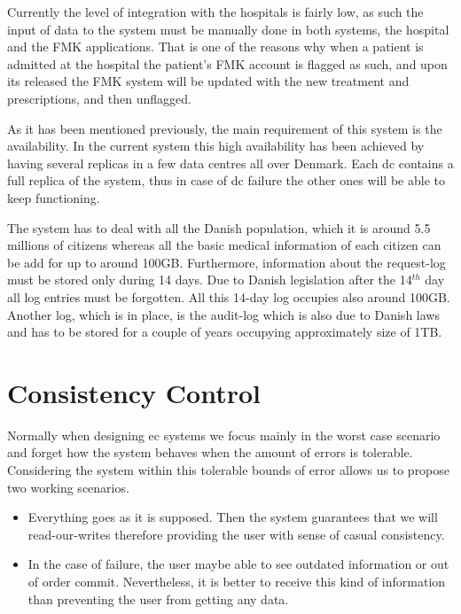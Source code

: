 \documentclass[english]{article}
\begin{document}
Currently the level of integration with the hospitals is fairly low, as such the input of data to the system must be manually done in both systems, the hospital and the FMK applications. That is one of the reasons why when a patient is admitted at the hospital the patient's FMK account is flagged as such, and upon its released the FMK system will be updated with the new treatment and prescriptions, and then unflagged.

As it has been mentioned previously, the main requirement of this system is the availability. In the current system this high availability has been achieved by having several replicas in a few data centres all over Denmark. Each \gls{dc} contains a full replica of the system, thus in case of \gls{dc} failure the other ones will be able to keep functioning.

The system has to deal with all the Danish population, which it is around 5.5 millions of citizens whereas all the basic medical information of each citizen can be add for up to around 100GB. Furthermore, information about the request-log must be stored only during 14 days. Due to Danish legislation after the 14$^{th}$ day all log entries must be forgotten. All this 14-day log occupies also around 100GB. Another log, which is in place, is the audit-log which is also due to Danish laws and has to be stored for a couple of years occupying approximately size of 1TB. 



\section{Consistency Control}

Normally when designing \gls{ec} systems we focus mainly in the worst case scenario and forget how the system behaves when the amount of errors is tolerable. Considering the system within this tolerable bounds of error allows us to propose two working scenarios.
\begin{itemize}
	\item Everything goes as it is supposed. Then the system guarantees that we will read-our-writes therefore providing the user with sense of casual consistency.
	\item In the case of failure, the user maybe able to see outdated information or out of order commit. Nevertheless, it is better to receive this kind of information than preventing the user from getting any data.
\end{itemize}
\end{document}
